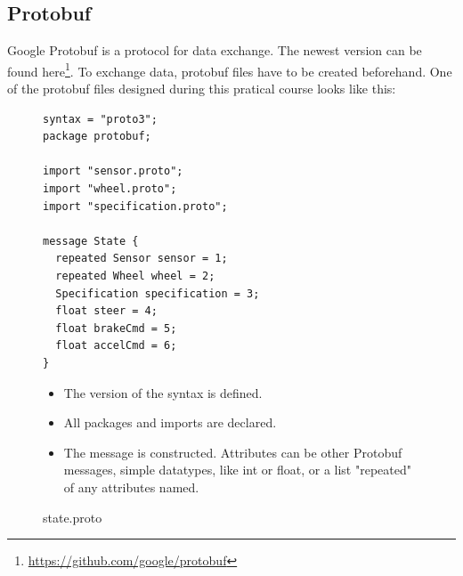 \documentclass[paper=a4, fontsize=11pt]{scrreprt}
\begin{document}
  \subsection{Protobuf}
Google Protobuf is a protocol for data exchange.
The newest version can be found here\footnote{\url{https://github.com/google/protobuf}}.
To exchange data, protobuf files have to be created beforehand.
One of the protobuf files designed during this pratical course looks like this:
\begin{figure}[!h]
\begin{minipage}{0.5\textwidth}
\centering
  \begin{verbatim}
syntax = "proto3";
package protobuf;

import "sensor.proto";
import "wheel.proto";
import "specification.proto";

message State {
  repeated Sensor sensor = 1;
  repeated Wheel wheel = 2;
  Specification specification = 3;
  float steer = 4;
  float brakeCmd = 5;
  float accelCmd = 6;
}
  \end{verbatim}
\end{minipage}
  \begin{minipage}{0.5\textwidth}
    \begin{itemize}
\item The version of the syntax is defined.
\item All packages and imports are declared.
\item The message is constructed. Attributes can be other Protobuf messages, simple datatypes, like int or float, or a list "repeated" of any attributes named.
    \end{itemize}
  \end{minipage}
    \caption{state.proto}
  \end{figure}
\end{document}
